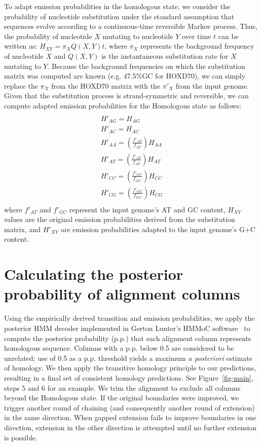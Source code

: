 \documentclass[10pt,journal,letterpaper,compsoc,peerreview]{IEEEtran}
\begin{document}
To adapt emission probabilities in the homologous state, we consider the
probability of nucleotide substitution under the standard assumption
that sequences evolve according to a continuous-time reversible Markov process.
Thus, the probability of nucleotide $X$ mutating to nucleotide $Y$ over time $t$
can be written as: $H_{XY}=\pi_X Q(X,Y)t$, where $\pi_X$ represents the background
frequency of nucleotide $X$ and $Q(X,Y)$ is the instantaneous substitution rate for $X$
mutating to $Y$. Because the background frequencies on which the substitution matrix was computed are
known (e.g. 47.5\%GC for HOXD70), we can simply replace the $\pi_X$ from the HOXD70 matrix
with the $\pi'_X$ from the input genome. Given that the substitution process is
strand-symmetric and reversible, we can compute adapted
emission probabilities for the Homologous state as follows:
\begin{multline}\\
H'_{AG}=H_{AG}\\
H'_{AC}=H_{AC}\\
H'_{AA}=(\frac{f'_{AT}}{f_{AT}})H_{AA}\\
H'_{AT}=(\frac{f'_{AT}}{f_{AT}})H_{AT}\\
H'_{CC}=(\frac{f'_{GC}}{f_{GC}})H_{CC}\\
H'_{CG}=(\frac{f'_{GC}}{f_{GC}})H_{CG}\\
\end{multline}
where $f'_{AT}$ and $f'_{GC}$ represent the input genome's AT and GC content,
$H_{XY}$ values are the original emission probabilities derived from the
substitution matrix, and $H'_{XY}$ are emission probabilities adapted to
the input genome's G+C content.



\section{Calculating the posterior probability of alignment columns}
Using the empirically derived transition and emission probabilities,
we apply the posterior HMM decoder implemented in Gerton Lunter's
HMMoC software~\cite{Lunter2007} to compute the posterior probability (p.p.) that
each alignment column represents homologous sequence.  Columns with a
p.p. below 0.5 are considered to be unrelated; use of 0.5 as a p.p. threshold
yields a maximum \textit{a posteriori} estimate of homology.  We then apply the
transitive homology principle to our predictions, resulting in a final
set of consistent homology predictions.  See Figure~\ref{fig-main},
steps 5 and 6 for an example. We trim the alignment to exclude all
columns beyond the Homologous state. If the original boundaries were
improved, we trigger another round of chaining (and consequently
another round of extension) in the same direction.
When gapped extension fails to improve boundaries
in one direction, extension in the other direction is attempted until
no further extension is possible.
\end{document}
